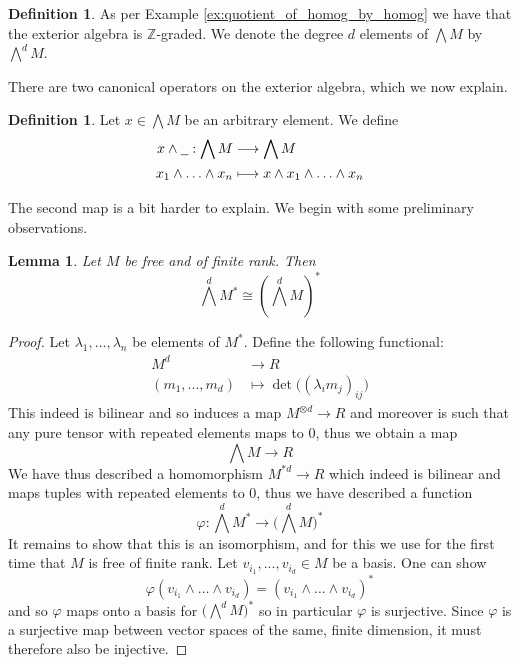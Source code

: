 \documentclass[12pt]{article}
\theoremstyle{plain}
\newtheorem{lemma}[thm]{Lemma}
\theoremstyle{definition}
\newtheorem{defn}[thm]{Definition} %
\newcommand{\bb}[1]{\mathbb{#1}}
\newcommand{\und}[1]{\underline{\hspace{#1 cm}}}
\newcommand{\lto}{\longrightarrow}
\begin{document}
\begin{defn}
As per Example \ref{ex:quotient_of_homog_by_homog} we have that the exterior algebra is $\bb{Z}$-graded. We denote the degree $d$ elements of $\bigwedge M$ by $\bigwedge^d M$.
\end{defn}
There are two canonical operators on the exterior algebra, which we now explain.
\begin{defn}
Let $x \in \bigwedge M$ be an arbitrary element. We define
\begin{align*}
x \wedge \und{0.2}: \bigwedge M &\lto \bigwedge M\\
x_1 \wedge \hdots \wedge x_n &\longmapsto x \wedge x_1 \wedge \hdots \wedge x_n
\end{align*}
\end{defn}
The second map is a bit harder to explain. We begin with some preliminary observations.
\begin{lemma}
Let $M$ be free and of finite rank. Then
\begin{equation}
\bigwedge^d M^{\ast} \cong (\bigwedge^d M)^\ast
\end{equation}
\end{lemma}
\begin{proof}
Let $\lambda_1,...,\lambda_n$ be elements of $M^\ast$. Define the following functional:
\begin{align*}
M^d &\lto R\\
(m_1,...,m_d) &\longmapsto \operatorname{det}\big((\lambda_i m_j)_{ij}\big)
\end{align*}
This indeed is bilinear and so induces a map $M^{\otimes d} \lto R$ and moreover is such that any pure tensor with repeated elements maps to $0$, thus we obtain a map
\begin{equation}
\bigwedge M \lto R
\end{equation}
We have thus described a homomorphism $M^{\ast d} \lto R$ which indeed is bilinear and maps tuples with repeated elements to $0$, thus we have described a function
\begin{equation}
\varphi: \bigwedge^d M^{\ast} \lto \big(\bigwedge^d M\big)^{\ast}
\end{equation}
It remains to show that this is an isomorphism, and for this we use for the first time that $M$ is free of finite rank. Let $v_{i_1},...,v_{i_d} \in M$ be a basis. One can show
\begin{equation}
\varphi(v_{i_1} \wedge \hdots \wedge v_{i_d}) = (v_{i_1} \wedge \hdots \wedge v_{i_d})^{\ast}
\end{equation}
and so $\varphi$ maps onto a basis for $\big(\bigwedge^d M\big)^\ast$ so in particular $\varphi$ is surjective. Since $\varphi$ is a surjective map between vector spaces of the same, finite dimension, it must therefore also be injective.
\end{proof}
\end{document}
